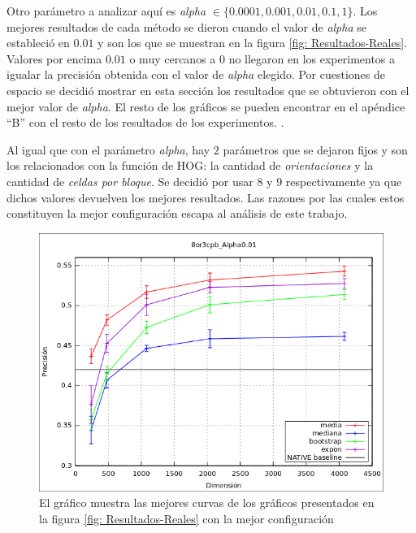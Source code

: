 	Otro parámetro a analizar aquí es \textit{alpha} $\in \{ 0.0001, 0.001, 0.01, 0.1, 1\}$. Los mejores resultados de cada método se dieron cuando el valor de \textit{alpha} se estableció en $0.01$ y son los que se muestran en la figura \ref{fig: Resultados-Reales}. Valores por encima $0.01$ o muy cercanos a 0 no llegaron en los experimentos a igualar la precisión obtenida con el valor de \textit{alpha} elegido. Por cuestiones de espacio se decidió mostrar en esta sección los resultados que se obtuvieron con el mejor valor de \textit{alpha}. El resto de los gráficos se pueden encontrar en el apéndice ``B'' con el resto de los resultados de los experimentos. .
	
	Al igual que con el parámetro \textit{alpha}, hay $2$ parámetros que se dejaron fijos y son los relacionados con la función de HOG: la cantidad de \textit{orientaciones} y la cantidad de \textit{celdas por bloque}. Se decidió por usar $8$ y $9$ respectivamente ya que dichos valores devuelven los mejores resultados. Las razones por las cuales estos constituyen la mejor configuración escapa al análisis de este trabajo.
	
	
			\begin{figure}[htbp]
				\centering
				\includegraphics[scale=0.6]{img/resultados/reales/comparativa_metodos.png}
				\caption[Reales comparativa]{El gráfico muestra las mejores curvas de los gráficos presentados en la figura \ref{fig: Resultados-Reales} con la mejor configuración}
				\label{fig: Reales-Comparativa metodos}
			\end{figure}
	
